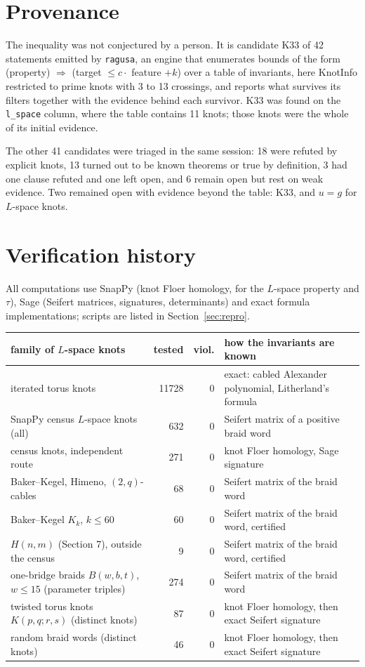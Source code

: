 \documentclass[11pt]{article}
\theoremstyle{definition}
\begin{document}
\section{Provenance}

The inequality was not conjectured by a person. It is candidate K33 of 42 statements emitted by \texttt{ragusa}, an
engine that enumerates bounds of the form (property) $\Rightarrow$ (target $\le c \cdot$ feature $+ k$) over a table of
invariants, here KnotInfo \cite{KnotInfo} restricted to prime knots with 3 to 13 crossings, and reports what survives its filters
together with the evidence behind each survivor. K33 was found on the \texttt{l\_space} column, where the table
contains 11 knots; those knots were the whole of its initial evidence.

The other 41 candidates were triaged in the same session: 18 were refuted by explicit knots, 13 turned out to be known
theorems or true by definition, 3 had one clause refuted and one left open, and 6 remain open but rest on weak
evidence. Two remained open with evidence beyond the table: K33, and $u = g$ for $L$-space knots.

\section{Verification history}

All computations use SnapPy (knot Floer homology, for the $L$-space property and $\tau$), Sage (Seifert matrices,
signatures, determinants) and exact formula implementations; scripts are listed in Section~\ref{sec:repro}.

\begin{center}\small
\begin{tabular}{p{5.1cm}rrp{5.4cm}}
\toprule
family of $L$-space knots & tested & viol. & how the invariants are known \\
\midrule
iterated torus knots & 11728 & 0 & exact: cabled Alexander polynomial, Litherland's formula \\
SnapPy census $L$-space knots (all) & 632 & 0 & Seifert matrix of a positive braid word \\
census knots, independent route & 271 & 0 & knot Floer homology, Sage signature \\
Baker--Kegel, Himeno, $(2,q)$-cables & 68 & 0 & Seifert matrix of the braid word \\
Baker--Kegel $K_k$, $k \le 60$ & 60 & 0 & Seifert matrix of the braid word, certified \\
$H(n,m)$ (Section 7), outside the census & 9 & 0 & Seifert matrix of the braid word, certified \\
one-bridge braids $B(w,b,t)$, $w \le 15$ (parameter triples) & 274 & 0 & Seifert matrix of the braid word \\
twisted torus knots $K(p,q;r,s)$ (distinct knots) & 87 & 0 & knot Floer homology, then exact Seifert signature \\
random braid words (distinct knots) & 46 & 0 & knot Floer homology, then exact Seifert signature \\
\bottomrule
\end{tabular}
\end{center}
\end{document}
